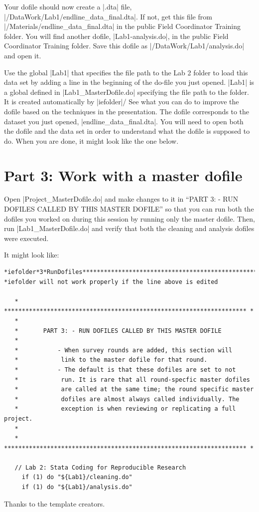 \documentclass{tufte-handout}
\begin{document}
Your dofile should now create a |.dta| file,
|/DataWork/Lab1/endline_data_final.dta|.
If not, get this file from |/Materials/endline_data_final.dta|
in the public Field Coordinator Training folder.
You will find another dofile, |Lab1-analysis.do|,
in the public Field Coordinator Training folder.
Save this dofile as |/DataWork/Lab1/analysis.do| and open it.

Use the global |Lab1| that specifies the file path
to the Lab 2 folder to load this data set
by adding a line in the beginning of the do-file you just opened.
|Lab1| is a global defined in |Lab1_MasterDofile.do|
specifying the file path to the folder.
It is created automatically by |iefolder|/
See what you can do to improve the dofile
based on the techniques in the presentation.
The dofile corresponds to the dataset you just opened,
|endline_data_final.dta|.
You will need to open both the dofile and the data set
in order to understand what the dofile is supposed to do.
When you are done, it might look like the one below.


\begin{figure}[h]
{
}
\end{figure}

\section{Part 3: Work with a master dofile}

Open |Project_MasterDofile.do| and make changes to it
in ``PART 3: - RUN DOFILES CALLED BY THIS MASTER DOFILE''
so that you can run both the dofiles you worked on during this session
by running only the master dofile.
Then, run |Lab1_MasterDofile.do| and verify
that both the cleaning and analysis dofiles were executed.

It might look like:

\begin{Verbatim}
*iefolder*3*RunDofiles**********************************************************
*iefolder will not work properly if the line above is edited

   * ******************************************************************** *
   *
   *       PART 3: - RUN DOFILES CALLED BY THIS MASTER DOFILE
   *
   *           - When survey rounds are added, this section will
   *            link to the master dofile for that round.
   *           - The default is that these dofiles are set to not
   *            run. It is rare that all round-specfic master dofiles
   *            are called at the same time; the round specific master
   *            dofiles are almost always called individually. The
   *            exception is when reviewing or replicating a full project.
   *
   * ******************************************************************** *

   // Lab 2: Stata Coding for Reproducible Research
     if (1) do "${Lab1}/cleaning.do"
     if (1) do "${Lab1}/analysis.do"
\end{Verbatim}

Thanks to the template creators.\cite{tuftelatex}



\end{document}
